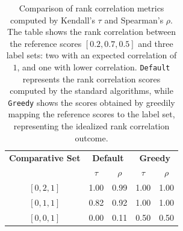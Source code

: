 \begin{table}[t]
  \centering
  \caption{Comparison of rank correlation metrics computed by Kendall's $\tau$ and Spearman's $\rho$. The table shows the rank correlation between the reference scores $[0.2,0.7,0.5]$ and three label sets: two with an expected correlation of $1$, and one with lower correlation. \texttt{Default} represents the rank correlation scores computed by the standard algorithms, while \texttt{Greedy} shows the scores obtained by greedily mapping the reference scores to the label set, representing the idealized rank correlation outcome.}
  \label{tab:rank-correlation}
  \begin{tabular}{ccccc}
      \toprule
      \textbf{Comparative Set} & \multicolumn{2}{c}{\textbf{Default}} & \multicolumn{2}{c}{\textbf{Greedy}} \\
      \cmidrule(lr){2-3} \cmidrule(lr){4-5}
                               & $\tau$ & $\rho$ & $\tau$ & $\rho$ \\
      \midrule
      
      $[0, 2, 1]$ & 1.00 & 0.99  & 1.00  & 1.00 \\
      $[0, 1, 1]$ & 0.82 & 0.92  & 1.00  & 1.00 \\
      $[0, 0, 1]$ & 0.00 & 0.11  & 0.50  & 0.50 \\
      \bottomrule
  \end{tabular}
\end{table}

